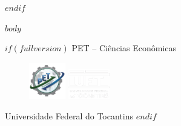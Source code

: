 \documentclass[twocolumn, a4paper, 10pt]{report}
\begin{document}
    \clearpage
    {\hypersetup{linkcolor=primarycolor}
	    \tableofcontents\thispagestyle{empty}
    }
    \clearpage


    \printnoidxglossary[toctitle=Siglas, title=Siglas, type=\acronymtype, nonumberlist]\thispagestyle{empty}

    $endif$
    
    $body$

    $if(fullversion)$
        \clearpage
        \color{white}
        \onecolumn
        \pagestyle{empty} %
        \vspace*{\fill}
        \centering
        \normalsize{PET -- Ciências Econômicas}
        \begin{figure}[H]
            \centering
            \includegraphics[width=1.6cm]{images/pet.png}
            \hspace{5pt}
            \includegraphics[width=1.8cm]{images/uft.png}
        \end{figure}
        \normalsize{Universidade Federal do Tocantins}
    $endif$
\end{document}
